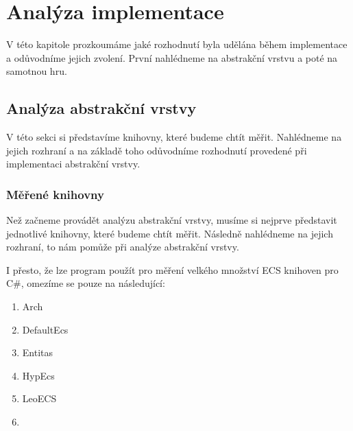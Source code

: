 \chapter{Analýza implementace}
V této kapitole prozkoumáme jaké rozhodnutí byla udělána během implementace a odůvodníme jejich zvolení. První nahlédneme na abstrakční vrstvu a poté na samotnou hru.

\section{Analýza abstrakční vrstvy}
V této sekci si představíme knihovny, které budeme chtít měřit. Nahlédneme na jejich rozhraní a na základě toho odůvodníme rozhodnutí provedené při implementaci abstrakční vrstvy.

\subsection{Měřené knihovny}
Než začneme provádět analýzu abstrakční vrstvy, musíme si nejprve představit jednotlivé knihovny, které budeme chtít měřit. Následně nahlédneme na jejich rozhraní, to nám pomůže při analýze abstrakční vrstvy.

I přesto, že lze program použít pro měření velkého množství ECS knihoven pro C\#, omezíme se pouze na následující:

\begin{enumerate}
    \item Arch~\cite{Arch}
    \item DefaultEcs~\cite{DefaultEcs}
    \item Entitas~\cite{Entitas}
    \item HypEcs~\cite{HypEcs}
    \item LeoECS~\cite{LeoECS}
    \item {}
\end{enumerate}

\\\\



